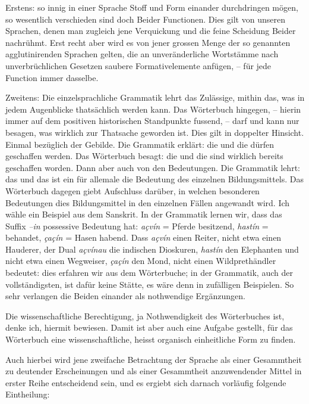 Erstens: so innig in einer Sprache Stoff und Form einander durchdringen mögen, so wesentlich verschieden sind doch Beider Functionen. Dies gilt von unseren Sprachen, denen man zugleich jene Verquickung und die feine Scheidung Beider nachrühmt. Erst recht aber wird es von jener grossen Menge der so genannten agglutinirenden Sprachen gelten, die an unveränderliche Wortstämme nach unverbrüchlichen Gesetzen saubere Formativelemente anfügen, – für jede Function immer dasselbe.

Zweitens: Die einzelsprachliche Grammatik lehrt das Zulässige, mithin das, was in jedem Augenblicke thatsächlich werden kann. Das Wörterbuch hingegen, – hierin immer auf dem positiven historischen Standpunkte fussend, – darf und kann nur besagen, was wirklich zur Thatsache geworden ist. Dies \label{sp.123} gilt in doppelter Hinsicht. Einmal bezüglich der Gebilde. Die Grammatik erklärt: die und die dürfen geschaffen werden. Das Wörterbuch besagt: die und die sind wirklich bereits geschaffen worden. Dann aber auch von den Bedeutungen. Die Grammatik lehrt: das und das ist ein für allemale die Bedeutung des einzelnen Bildungsmittels. Das Wörterbuch dagegen giebt Aufschluss darüber, in welchen besonderen Bedeutungen dies Bildungsmittel in den einzelnen Fällen angewandt wird. Ich wähle ein Beispiel aus dem Sanskrit. In der Grammatik lernen wir, dass das Suffix \textit{–in }possessive Bedeutung hat: \textit{açvín} = Pferde besitzend, \textit{hastín} = behandet, \textit{çaçín} = Hasen habend. Dass \textit{açvín} einen Reiter, nicht etwa einen Hauderer, der Dual \textit{açvínau} die indischen Dioskuren, \textit{hastín} den Elephanten und nicht etwa einen Wegweiser, \textit{çaçín} den Mond, nicht einen Wildprethändler bedeutet: dies erfahren wir aus dem Wörterbuche; in der Grammatik, auch der vollständigsten, ist dafür keine Stätte, es wäre denn in zufälligen Beispielen. So sehr verlangen die Beiden einander als nothwendige Ergänzungen.

Die wissenschaftliche Berechtigung, ja Nothwendigkeit des Wörterbuches ist, denke ich, hiermit bewiesen. Damit ist aber auch eine Aufgabe gestellt, für das Wörterbuch eine wissenschaftliche,  heisst organisch einheitliche Form zu finden.

Auch hierbei wird jene zweifache Betrachtung der Sprache als einer Gesammtheit zu deutender Erscheinungen und als einer Gesammtheit anzuwendender Mittel in erster Reihe entscheidend sein, und es ergiebt sich darnach vorläufig folgende Eintheilung:

